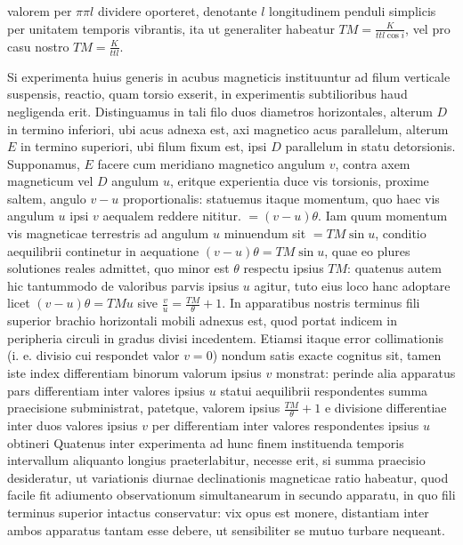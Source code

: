 valorem per $\pi\pi l$ dividere oporteret, denotante $l$ longitudinem penduli simplicis per unitatem temporis vibrantis, ita ut generaliter habeatur $TM=\frac{K}{ttl\cos i}$, vel pro casu nostro $TM=\frac{K}{ttl}$.

Si experimenta huius generis in acubus magneticis instituuntur ad filum verticale suspensis, reactio, quam torsio exserit, in experimentis subtilioribus haud negligenda erit. Distinguamus in tali filo duos diametros horizontales, alterum $D$ in termino inferiori, ubi acus adnexa est, axi magnetico acus parallelum, alterum $E$ in termino superiori, ubi filum fixum est, ipsi $D$ parallelum in statu detorsionis. Supponamus, $E$ facere cum meridiano magnetico angulum $v$, contra axem magneticum vel $D$ angulum $u$, eritque experientia duce vis torsionis, proxime saltem, angulo $v-u$ proportionalis: statuemus itaque momentum, quo haec vis angulum $u$ ipsi $v$ aequalem reddere nititur. $=(v-u)\theta$. Iam quum momentum vis magneticae terrestris ad angulum $u$ minuendum sit $=TM\sin u$, conditio aequilibrii continetur in aequatione $(v-u)\theta=TM\sin u$, quae eo plures solutiones reales admittet, quo minor est $\theta$ respectu ipsius $TM$: quatenus autem hic tantummodo de valoribus parvis ipsius $u$ agitur, tuto eius loco hanc adoptare licet $(v-u)\theta=TMu$ sive $\frac vu=\frac{TM}{\theta}+1$. In apparatibus nostris terminus fili superior brachio horizontali mobili adnexus est, quod portat indicem in peripheria circuli in gradus divisi incedentem. Etiamsi itaque error collimationis (i. e. divisio cui respondet valor $v=0$) nondum satis exacte cognitus sit, tamen iste index differentiam binorum valorum ipsius $v$ monstrat: perinde alia apparatus pars differentiam inter valores ipsius $u$ statui aequilibrii respondentes summa praecisione subministrat, patetque, valorem ipsius $\frac{TM}{\theta}+1$ e divisione differentiae inter duos valores ipsius $v$ per differentiam inter valores respondentes ipsius $u$ obtineri Quatenus inter experimenta ad hunc finem instituenda temporis intervallum aliquanto longius praeterlabitur, necesse erit, si summa praecisio desideratur, ut variationis diurnae declinationis magneticae ratio habeatur, quod facile fit adiumento observationum simultanearum in secundo apparatu, in quo fili terminus superior intactus conservatur: vix opus est monere, distantiam inter ambos apparatus tantam esse debere, ut sensibiliter se mutuo turbare nequeant.

